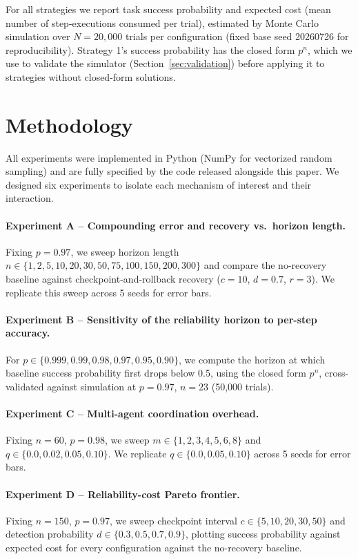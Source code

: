 \documentclass[11pt]{article}
\begin{document}
For all strategies we report task success probability and expected cost (mean number of step-executions consumed per trial), estimated by Monte Carlo simulation over $N=20{,}000$ trials per configuration (fixed base seed 20260726 for reproducibility). Strategy 1's success probability has the closed form $p^n$, which we use to validate the simulator (Section~\ref{sec:validation}) before applying it to strategies without closed-form solutions.

\section{Methodology}
All experiments were implemented in Python (NumPy for vectorized random sampling) and are fully specified by the code released alongside this paper. We designed six experiments to isolate each mechanism of interest and their interaction.

\paragraph{Experiment A -- Compounding error and recovery vs.\ horizon length.} Fixing $p=0.97$, we sweep horizon length $n \in \{1,2,5,10,20,30,50,75,100,150,200,300\}$ and compare the no-recovery baseline against checkpoint-and-rollback recovery ($c=10$, $d=0.7$, $r=3$). We replicate this sweep across 5 seeds for error bars.

\paragraph{Experiment B -- Sensitivity of the reliability horizon to per-step accuracy.} For $p \in \{0.999, 0.99, 0.98, 0.97, 0.95, 0.90\}$, we compute the horizon at which baseline success probability first drops below 0.5, using the closed form $p^n$, cross-validated against simulation at $p=0.97$, $n=23$ (50,000 trials).

\paragraph{Experiment C -- Multi-agent coordination overhead.} Fixing $n=60$, $p=0.98$, we sweep $m \in \{1,2,3,4,5,6,8\}$ and $q \in \{0.0, 0.02, 0.05, 0.10\}$. We replicate $q \in \{0.0, 0.05, 0.10\}$ across 5 seeds for error bars.

\paragraph{Experiment D -- Reliability-cost Pareto frontier.} Fixing $n=150$, $p=0.97$, we sweep checkpoint interval $c \in \{5,10,20,30,50\}$ and detection probability $d \in \{0.3,0.5,0.7,0.9\}$, plotting success probability against expected cost for every configuration against the no-recovery baseline.
\end{document}

